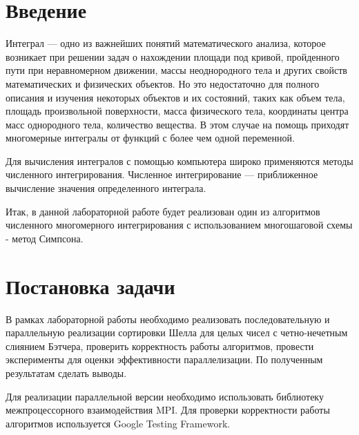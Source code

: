 \documentclass{report}
\begin{document}
\setcounter{page}{2}

\tableofcontents
\newpage

\section*{Введение}
Интеграл — одно из важнейших понятий математического анализа, которое возникает при решении задач о нахождении площади под кривой, пройденного пути при неравномерном движении, массы неоднородного тела и других свойств математических и физических объектов. Но это недостаточно для полного описания и изучения некоторых объектов и их состояний, таких как объем тела, площадь произвольной поверхности, масса физического тела, координаты центра масс однородного тела, количество вещества. В этом случае на помощь приходят многомерные интегралы от функций с более чем одной переменной.
\par Для вычисления интегралов с помощью компьютера широко применяются методы численного интегрирования. Численное интегрирование — приближенное вычисление значения определенного интеграла.
\par Итак, в данной лабораторной работе будет реализован один из алгоритмов численного многомерного интегрирования с использованием многошаговой схемы - метод Симпсона.
\newpage

\section*{Постановка задачи}
В рамках лабораторной работы необходимо реализовать последовательную и параллельную реализации сортировки Шелла для целых чисел с четно-нечетным слиянием Бэтчера, проверить корректность работы алгоритмов, провести эксперименты для оценки эффективности параллелизации. По полученным результатам сделать выводы.
\par Для реализации параллельной версии необходимо использовать библиотеку межпроцессорного взаимодействия MPI. Для проверки корректности работы алгоритмов используется Google Testing Framework.
\newpage

\end{document}
